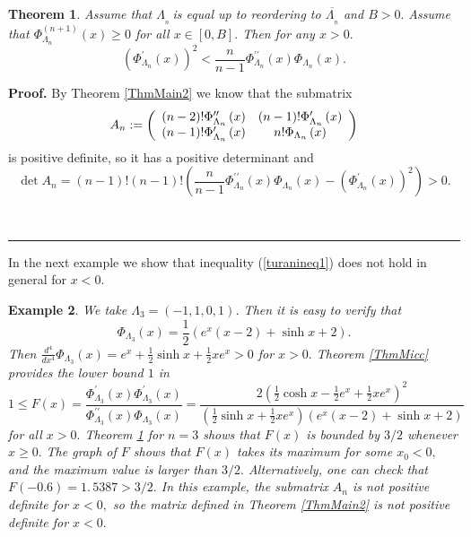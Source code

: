 \documentclass[11pt]{article}%
\newtheorem{theorem}{Theorem}
\newtheorem{example}[theorem]{Example}
\newenvironment{proof}[1][Proof]{\textbf{#1.} }{\ \rule{0.5em}{0.5em}}
\begin{document}
\begin{theorem}
\label{ThmMain4}Assume that $\Lambda_{_{n}}\ $is equal up to reordering to
$\overline{\Lambda_{_{n}}}$ and $B>0.$ Assume that $\Phi_{\Lambda_{n}%
}^{\left(  n+1\right)  }\left(  x\right)  \geq0$ for all $x\in\left[
0,B\right]  .$ Then for any $x>0.$
\begin{equation}
\left(  \Phi_{\Lambda_{n}}^{\prime}\left(  x\right)  \right)  ^{2}<\frac
{n}{n-1}\Phi_{\Lambda_{n}}^{\prime\prime}\left(  x\right)  \Phi_{\Lambda_{n}%
}\left(  x\right)  . \label{turanineq1}%
\end{equation}

\end{theorem}

\begin{proof}
By Theorem \ref{ThmMain2} we know that the submatrix
\[
A_{n}:=\left(
\begin{array}
[c]{cc}%
\left(  n-2\right)  !\Phi_{\Lambda_{n}}^{\prime\prime}\left(  x\right)  &
\left(  n-1\right)  !\Phi_{\Lambda_{n}}^{\prime}\left(  x\right) \\
\left(  n-1\right)  !\Phi_{\Lambda_{n}}^{\prime}\left(  x\right)  &
n!\Phi_{\Lambda_{n}}\left(  x\right)
\end{array}
\right)
\]
is positive definite, so it has a positive determinant and
\[
\det A_{n}=\left(  n-1\right)  !\left(  n-1\right)  !\left(  \frac{n}{n-1}%
\Phi_{\Lambda_{n}}^{\prime\prime}\left(  x\right)  \Phi_{\Lambda_{n}}\left(
x\right)  -\left(  \Phi_{\Lambda_{n}}^{\prime}\left(  x\right)  \right)
^{2}\right)  >0.
\]

\end{proof}

In the next example we show that inequality (\ref{turanineq1}) does not hold
in general for $x<0.$

\begin{example}
\label{Example1}We take $\Lambda_{3}=\left(  -1,1,0,1\right)  $. Then it is
easy to verify that
\[
\Phi_{\Lambda_{3}}\left(  x\right)  =\frac{1}{2}\left(  e^{x}\left(
x-2\right)  +\sinh x+2\right)  .
\]
Then $\frac{d^{4}}{dx^{4}}\Phi_{\Lambda_{3}}\left(  x\right)  =e^{x}+\frac
{1}{2}\sinh x+\frac{1}{2}xe^{x}>0$ for $x>0.$ Theorem \ref{ThmMicc} provides
the lower bound $1$ in
\[
1\leq F\left(  x\right)  =\frac{\Phi_{\Lambda_{3}}^{\prime}\left(  x\right)
\Phi_{\Lambda_{3}}^{\prime}\left(  x\right)  }{\Phi_{\Lambda_{3}}%
^{\prime\prime}\left(  x\right)  \Phi_{\Lambda_{3}}\left(  x\right)  }%
=\frac{2\left(  \frac{1}{2}\cosh x-\frac{1}{2}e^{x}+\frac{1}{2}xe^{x}\right)
^{2}}{\left(  \frac{1}{2}\sinh x+\frac{1}{2}xe^{x}\right)  \left(
e^{x}\left(  x-2\right)  +\sinh x+2\right)  }%
\]
for all $x>0.$ Theorem \ref{ThmMain4} for $n=3$ shows that $F\left(  x\right)
$ is bounded by $3/2$ whenever $x\geq0.$ The graph of $F$ shows that $F\left(
x\right)  $ takes its maximum for some $x_{0}<0,$ and the maximum value is
larger than $3/2.$ Alternatively, one can check that $F\left(  -0.6\right)
=1.\,\allowbreak5387>3/2.$ In this example, the submatrix $A_{n}$ is not
positive definite for $x<0,$ so the matrix defined in Theorem \ref{ThmMain2}
is not positive definite for $x<0.$
\end{example}
\end{document}
